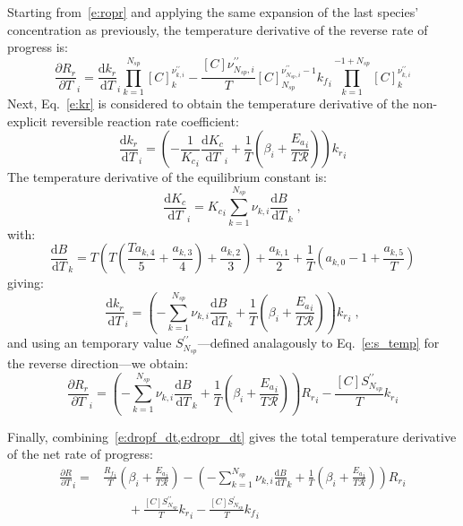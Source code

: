 \documentclass[12pt]{article}
\newcommand{\ns}{N_{sp}}
\newcommand{\Ru}{\mathcal{R}}
\begin{document}
Starting from~\cref{e:ropr} and applying the same expansion of the last species' concentration as previously, the temperature derivative of the reverse rate of progress is:
\begin{equation}
 \frac{\partial {R_r} }{\partial T }_{i} = \frac{\text{d} {k_r} }{\text{d} T }_{i} \prod_{k=1}^{\ns} [C]_{k}^{\nu^{\prime\prime}_{k,i}} - \frac{[C] \nu^{\prime\prime}_{\ns,i}}{T} [C]_{\ns}^{\nu^{\prime\prime}_{\ns,i} - 1} {k_f}_{i} \prod_{k=1}^{-1 + \ns} [C]_{k}^{\nu^{\prime\prime}_{k,i}}
\end{equation}
Next, Eq.~\cref{e:kr} is considered to obtain the temperature derivative of the non-explicit reversible reaction rate coefficient:
\begin{equation}
 \frac{\text{d} {k_r} }{\text{d} T }_{i} = \left(- \frac{1}{{K_c}_{i}} \frac{\text{d} {K_c} }{\text{d} T }_{i} + \frac{1}{T} \left(\beta_{i} + \frac{{E_{a}}_{i}}{T \Ru}\right)\right) {k_r}_{i}
\end{equation}
The temperature derivative of the equilibrium constant is:
\begin{equation}
 \frac{\text{d} {K_c} }{\text{d} T }_{i} = {K_c}_{i} \sum_{k=1}^{\ns} \nu_{k,i} \frac{\text{d} B }{\text{d} T }_{k} \;,
\end{equation}
with:
\begin{equation}
 \frac{\text{d} B }{\text{d} T }_{k} = T \left(T \left(\frac{T a_{k,4}}{5} + \frac{a_{k,3}}{4}\right) + \frac{a_{k,2}}{3}\right) + \frac{a_{k,1}}{2} + \frac{1}{T} \left(a_{k,0} - 1 + \frac{a_{k,5}}{T}\right)
\end{equation}
giving:
\begin{equation}
\label{e:dkr_dt}
\frac{\text{d} {k_r} }{\text{d} T }_{i} = \left(- \sum_{k=1}^{\ns} \nu_{k,i} \frac{\text{d} B }{\text{d} T }_{k} + \frac{1}{T} \left(\beta_{i} + \frac{{E_{a}}_{i}}{T \Ru}\right)\right) {k_r}_{i} \;,
\end{equation}
and using an temporary value $S^{\prime\prime}_{\ns}$---defined analagously to Eq.~\cref{e:s_temp} for the reverse direction---we obtain:
\begin{equation}
\label{e:dropr_dt}
\frac{\partial {R_r} }{\partial T }_{i} = \left(- \sum_{k=1}^{\ns} \nu_{k,i} \frac{\text{d} B }{\text{d} T }_{k} + \frac{1}{T} \left(\beta_{i} + \frac{{E_{a}}_{i}}{T \Ru}\right)\right) {R_r}_{i} - \frac{[C] S^{\prime\prime}_{\ns}}{T} {k_r}_{i}
\end{equation}

Finally, combining~\cref{e:dropf_dt,e:dropr_dt} gives the total temperature derivative of the net rate of progress:
\begin{align}
 \label{e:drop_dt}
 \frac{\partial R }{\partial T }_{i} =& \frac{{R_f}_{i}}{T} \left(\beta_{i} + \frac{{E_{a}}_{i}}{T \Ru}\right) - \left(- \sum_{k=1}^{\ns} \nu_{k,i} \frac{\text{d} B }{\text{d} T }_{k} + \frac{1}{T} \left(\beta_{i} + \frac{{E_{a}}_{i}}{T \Ru}\right)\right) {R_r}_{i} \nonumber \\
				      &\qquad + \frac{[C] S^{\prime\prime}_{\ns}}{T} {k_r}_{i} - \frac{[C] S^{\prime}_{\ns}}{T} {k_f}_{i}
\end{align}
\end{document}
